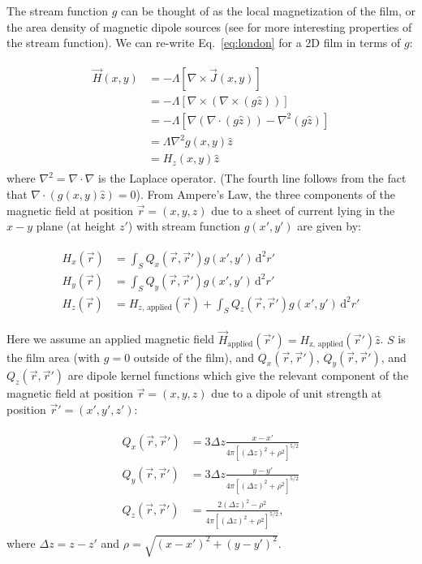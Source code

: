 \documentclass{article}
\begin{document}
The stream function $g$ can be thought of as the local magnetization of the film, or the area density of magnetic dipole sources (see \cite{brandt_thin_2005} for more interesting properties of the stream function). We can re-write Eq.~\ref{eq:london} for a 2D film in terms of $g$:

\begin{align}
    \label{eq:london_stream}
    \begin{split}
        \vec{H}(x, y) &= -\Lambda\left[\nabla\times\vec{J}(x, y)\right]\\
        &= -\Lambda\left[\nabla\times\left(\nabla\times(g\hat{z})\right)\right]\\
        &= -\Lambda\left[\nabla(\nabla\cdot(g\hat{z}))-\nabla^2(g\hat{z})\right]\\
        &=\Lambda\nabla^2g(x,y)\hat{z}\\
        &=H_z(x, y)\hat{z}
    \end{split}
\end{align}
where $\nabla^2=\nabla\cdot\nabla$ is the Laplace operator. (The fourth line follows from the fact that $\nabla\cdot\left(g(x,y)\hat{z}\right) = 0$). From Ampere's Law, the three components of the magnetic field at position $\vec{r}=(x, y, z)$ due to a sheet of current lying in the $x-y$ plane (at height $z'$) with stream function $g(x', y')$ are given by:

\begin{align}
    \label{eq:field_from_kernel}
    \begin{split}
        H_x(\vec{r}) &= \int_S Q_x(\vec{r},\vec{r}')g(x', y')\,\mathrm{d}^2r'\\
        H_y(\vec{r}) &= \int_S Q_y(\vec{r},\vec{r}')g(x', y')\,\mathrm{d}^2r'\\
        H_z(\vec{r}) &= H_{z,\,\mathrm{applied}}(\vec{r})
        + \int_S Q_z(\vec{r},\vec{r}')g(x', y')\,\mathrm{d}^2r'  
    \end{split}
\end{align}

Here we assume an applied magnetic field $\vec{H}_\mathrm{applied}(\vec{r}')=H_\mathrm{z,\,\mathrm{applied}}(\vec{r}')\hat{z}$. $S$ is the film area (with $g = 0$ outside of the film), and $Q_x(\vec{r},\vec{r}')$, $Q_y(\vec{r},\vec{r}')$, and $Q_z(\vec{r},\vec{r}')$ are dipole kernel functions which give the relevant component of the magnetic field at position $\vec{r}=(x, y, z)$ due to a dipole of unit strength at position $\vec{r}'=(x', y', z')$:

\begin{align}
    \label{eq:kernels}
    \begin{split}
        Q_x(\vec{r}, \vec{r}') &=  3\Delta z\frac{x-x'}
        {4\pi[(\Delta z)^2+\rho^2]^{5/2}}\\
        Q_y(\vec{r}, \vec{r}') &=  3\Delta z\frac{y-y'}
        {4\pi[(\Delta z)^2+\rho^2]^{5/2}}\\
        Q_z(\vec{r}, \vec{r}') &=  \frac{2(\Delta z)^2-\rho^2}
        {4\pi[(\Delta z)^2+\rho^2]^{5/2}},
    \end{split}
\end{align}
where $\Delta z = z - z'$ and $\rho=\sqrt{(x-x')^2 + (y-y')^2}$.
\end{document}
